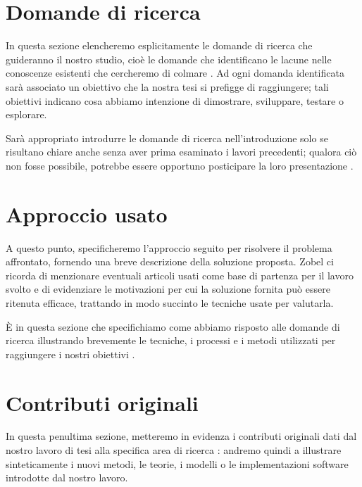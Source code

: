\section{Domande di ricerca}

In questa sezione elencheremo esplicitamente le domande di ricerca che guideranno il nostro studio, cioè le domande che identificano le lacune nelle conoscenze esistenti che cercheremo di colmare \cite{pfandzelter2022thesis}. Ad ogni domanda identificata sarà associato un obiettivo che la nostra tesi si prefigge di raggiungere; tali obiettivi indicano cosa abbiamo intenzione di dimostrare, sviluppare, testare o esplorare.

\medskip

Sarà appropriato introdurre le domande di ricerca nell'introduzione solo se risultano chiare anche senza aver prima esaminato i lavori precedenti; qualora ciò non fosse possibile, potrebbe essere opportuno posticipare la loro presentazione \cite{mannisto2022guide}.

\section{Approccio usato}

A questo punto, specificheremo l'approccio seguito per risolvere il problema affrontato, fornendo una breve descrizione della soluzione proposta. Zobel \cite{zobel2015writing} ci ricorda di menzionare eventuali articoli usati come base di partenza per il lavoro svolto e di evidenziare le motivazioni per cui la soluzione fornita può essere ritenuta efficace, trattando in modo succinto le tecniche usate per valutarla.

\medskip

È in questa sezione che specifichiamo come abbiamo risposto alle domande di ricerca illustrando brevemente le tecniche, i processi e i metodi utilizzati per raggiungere i nostri obiettivi \cite{pfandzelter2022thesis}.

\section{Contributi originali}

In questa penultima sezione, metteremo in evidenza i contributi originali dati dal nostro lavoro di tesi alla specifica area di ricerca \cite{pfandzelter2022thesis}: andremo quindi a illustrare sinteticamente i nuovi metodi, le teorie, i modelli o le implementazioni software introdotte dal nostro lavoro.

